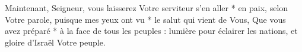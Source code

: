 Maintenant, Seigneur, vous laisserez Votre serviteur s'en aller * en paix, selon Votre parole,
\versseparator
puisque mes yeux ont vu * le salut qui vient de Vous,
\versseparator
Que vous avez préparé * à la face de tous les peuples :
\versseparator
lumière pour éclairer les nations, et gloire d'Israël Votre peuple.